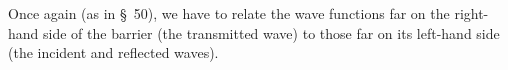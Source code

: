 Once again (as in \S~50), we have to relate the wave functions far on the
right-hand side of the barrier (the transmitted wave) to those far on its
left-hand side (the incident and reflected waves).
